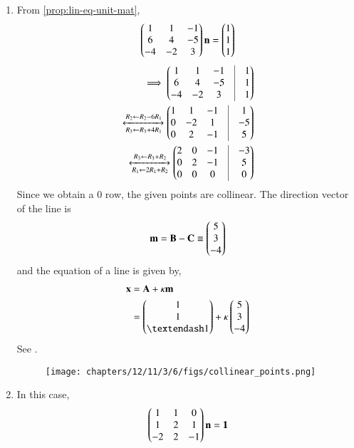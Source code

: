 \begin{enumerate}
	\item From 
		\eqref{prop:lin-eq-unit-mat},
\begin{align}
\begin{pmatrix}1&1&-1\\ 6&4&-5\\ -4&-2&3\end{pmatrix} \mathbf{n} = \begin{pmatrix}1\\1\\1\end{pmatrix}
\end{align}
\begin{align*}
	\implies \myvec{1&1&-1&\vrule&1\\6&4&-5&\vrule&1\\-4&-2&3&\vrule&1}
	\\
\xleftrightarrow[R_3 \leftarrow R_3 + 4R_1]{R_2 \leftarrow R_2 - 6R_1}
\myvec{1&1&-1&\vrule&1\\0&-2&1&\vrule&-5\\0&2&-1&\vrule&5}\\ 
\xleftrightarrow[{R_1 \leftarrow 2R_1 + R_2}] {R_3 \leftarrow R_3 + R_2}
\myvec{2&0&-1&\vrule&-3\\0&2&-1&\vrule&5\\0&0&0&\vrule&0}
\end{align*}
Since we obtain a 0 row, 
the given points are collinear.
The direction vector of the line is
\begin{align}
\mathbf{m}=\mathbf{B}-\mathbf{C} \equiv \begin{pmatrix}5\\3\\-4\end{pmatrix}
\end{align}
and the equation of a line is given by,
\begin{align}
	\vec{x}&=\vec{A}+  \kappa\vec{m}\\
&= \myvec{1\\1\\– 1} + \kappa \myvec{5\\3\\-4}
\end{align}
See 
     .
\begin{figure}[H]
  \centering
   \texttt{[image: chapters/12/11/3/6/figs/collinear\_points.png]}
    \caption{}
     \label{fig:chapters/12/11/3/6/1}
     \end{figure}
     \item  In this case, 
\begin{align}
\begin{pmatrix}1&1&0 \\ 1&2&1 \\ -2&2&-1\end{pmatrix} \mathbf{n}=\mathbf{1}
\end{align}

\end{enumerate}
